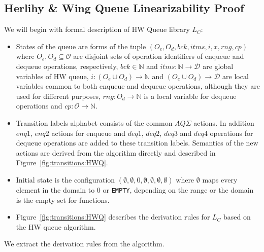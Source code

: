 \subsection{Herlihy \& Wing Queue Linearizability Proof}
We will begin with formal description of HW Queue library $L_C$:
\begin{itemize}
\item States of the queue are forms of the tuple $(O_e, O_d, bck, itms, i, x, rng, cp)$ where $O_e, O_d \subseteq \mathcal{O}$ are disjoint sets of operation identifiers of enqueue and dequeue operations, respectively, $bck \in \mathbb{N}$ and $itms: \mathbb{N} \rightarrow \mathcal{D}$ are global variables of HW queue, $i: (O_e \cup O_d) \rightarrow \mathbb{N}$ and $(O_e \cup O_d) \rightarrow \mathcal{D}$ are local variables common to both enqueue and dequeue operations, although they are used for different purposes, $rng: O_d \rightarrow \mathbb{N}$ is a local variable for dequeue operations and $cp: \mathcal{O} \rightarrow \mathbb{N}$.
\item Transition labels alphabet consists of the common $AQ\Sigma$ actions. In addition $enq1$, $enq2$ actions for enqueue and $deq1$, $deq2$, $deq3$ and $deq4$ operations for dequeue operations are added to these transition labels. Semantics of the new actions are derived from the algorithm directly and described in Figure~\ref{fig:transitions:HWQ}.
\item Initial state is the configuration $(\emptyset, \emptyset, 0, \emptyset, \emptyset, \emptyset, \emptyset)$ where $\emptyset$ maps every element in the domain to $0$ or \texttt{EMPTY}, depending on the range or the domain is the empty set for functions.
\item Figure~\ref{fig:transitions:HWQ} describes the derivation rules for $L_C$ based on the HW queue algorithm.
\end{itemize} 

We extract the derivation rules from the algorithm.

